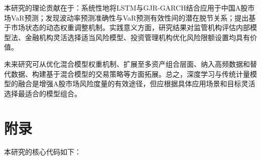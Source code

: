 \documentclass[12pt, a4paper]{article}
\begin{document}
本研究的理论贡献在于：系统性地将LSTM与GJR-GARCH结合应用于中国A股市场VaR预测；发现波动率预测准确性与VaR预测有效性间的潜在脱节关系；提出基于市场状态的动态权重调整机制。实践意义方面，研究结果对监管机构评估内部模型法、金融机构灵活选择适当风险模型、投资管理机构优化风险限额设置均具有价值。

未来研究可从优化混合模型权重机制、扩展至多资产组合层面、纳入高频数据和替代数据、构建基于混合模型的交易策略等方面拓展。总之，深度学习与传统计量模型的融合是增强A股市场风险度量的有效途径，但应根据具体应用场景和目标灵活选择最适合的模型组合。

\printbibliography[title=参考文献]

\section{附录}

本研究的核心代码如下：
\end{document}
